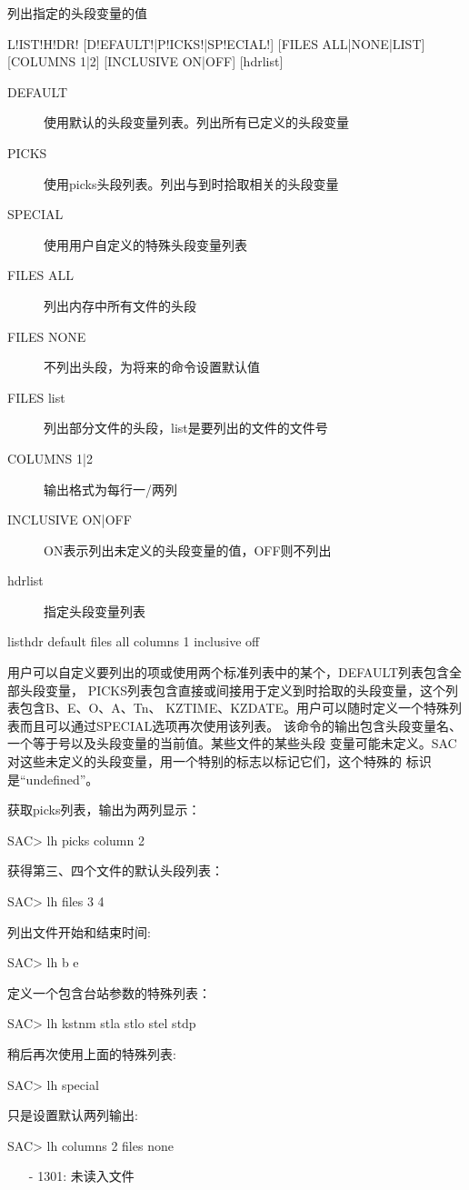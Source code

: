 \label{cmd:listhdr}

列出指定的头段变量的值

\begin{SACSTX}
L!IST!H!DR! [D!EFAULT!|P!ICKS!|SP!ECIAL!] [FILES ALL|NONE|LIST]
    [COLUMNS 1|2] [INCLUSIVE ON|OFF] [hdrlist]
\end{SACSTX}

\begin{description}
\item [DEFAULT] 使用默认的头段变量列表。列出所有已定义的头段变量
\item [PICKS] 使用picks头段列表。列出与到时拾取相关的头段变量
\item [SPECIAL] 使用用户自定义的特殊头段变量列表
\item [FILES ALL] 列出内存中所有文件的头段
\item [FILES NONE] 不列出头段，为将来的命令设置默认值
\item [FILES list] 列出部分文件的头段，list是要列出的文件的文件号
\item [COLUMNS 1|2] 输出格式为每行一/两列
\item [INCLUSIVE ON|OFF] ON表示列出未定义的头段变量的值，OFF则不列出
\item [hdrlist] 指定头段变量列表
\end{description}

\begin{SACDFT}
listhdr default files all columns 1 inclusive off
\end{SACDFT}

用户可以自定义要列出的项或使用两个标准列表中的某个，DEFAULT列表包含全部头段变量，
PICKS列表包含直接或间接用于定义到时拾取的头段变量，这个列表包含B、E、O、A、Tn、
KZTIME、KZDATE。用户可以随时定义一个特殊列表而且可以通过SPECIAL选项再次使用该列表。
该命令的输出包含头段变量名、一个等于号以及头段变量的当前值。某些文件的某些头段
变量可能未定义。SAC对这些未定义的头段变量，用一个特别的标志以标记它们，这个特殊的
标识是``undefined''。

获取picks列表，输出为两列显示：
\begin{SACCode}
SAC> lh picks column 2
\end{SACCode}

获得第三、四个文件的默认头段列表：
\begin{SACCode}
SAC> lh files 3 4
\end{SACCode}

列出文件开始和结束时间:
\begin{SACCode}
SAC> lh b e
\end{SACCode}

定义一个包含台站参数的特殊列表：
\begin{SACCode}
SAC> lh kstnm stla stlo stel stdp
\end{SACCode}

稍后再次使用上面的特殊列表:
\begin{SACCode}
SAC> lh special
\end{SACCode}

只是设置默认两列输出:
\begin{SACCode}
SAC> lh columns 2 files none
\end{SACCode}

\begin{itemize}
\item[-]1301: 未读入文件
\end{itemize}
